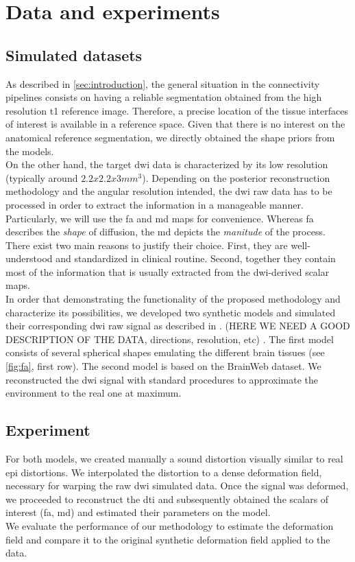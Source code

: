 \section{Data and experiments}
\label{sec:experiments}
%
\subsection{Simulated datasets}
%
As described in \autoref{sec:introduction}, the general situation in
the connectivity pipelines consists on having 
a reliable segmentation obtained from the high resolution \ac{t1} 
reference image. Therefore, a precise location of the tissue interfaces
of interest is available in a reference space. Given that there is no 
interest on the anatomical reference segmentation,
we directly obtained the shape priors from the models. \\

On the other hand, the target \ac{dwi} data is characterized by its
low resolution (typically around $2.2x2.2x3mm^3$). Depending on the
posterior reconstruction methodology and the angular resolution
intended, the \ac{dwi} raw data has to be processed in order to
extract the information in a manageable manner. Particularly, we
will use the \ac{fa} and \ac{md} maps for convenience.
Whereas \ac{fa} describes the \emph{shape} of diffusion, 
the \ac{md} depicts the \emph{manitude} of the process. 
There exist two main reasons to justify their choice. 
First, they are well-understood and standardized in clinical routine.
Second, together they contain most of the information that is
usually extracted from the \ac{dwi}-derived scalar maps. \\

In order that demonstrating the functionality of the proposed
methodology and characterize its possibilities, we developed two
synthetic models and simulated their corresponding \ac{dwi}
raw signal as described in \citep{tuch_q-ball_2004}. 
(HERE WE NEED A GOOD DESCRIPTION OF THE DATA, directions, resolution, etc)
. The first model consists of several spherical shapes emulating
the different brain tissues (see \autoref{fig:fa}, first row). 
The second model is based on the BrainWeb dataset.
We reconstructed the \ac{dwi} signal with standard procedures to approximate the
environment to the real one at maximum. \\

%
\subsection{Experiment}
%
For both models, we created manually a sound distortion visually similar
to real \ac{epi} distortions. We interpolated the distortion to a 
dense deformation field, necessary for warping the raw \ac{dwi} simulated
data. Once the signal was deformed, we proceeded to reconstruct the
\ac{dti} and subsequently obtained the scalars of interest (\ac{fa}, \ac{md}) and estimated their parameters on the model.\\

We evaluate the performance of our methodology to estimate the deformation
field and compare it to the original synthetic deformation field applied to the data.
